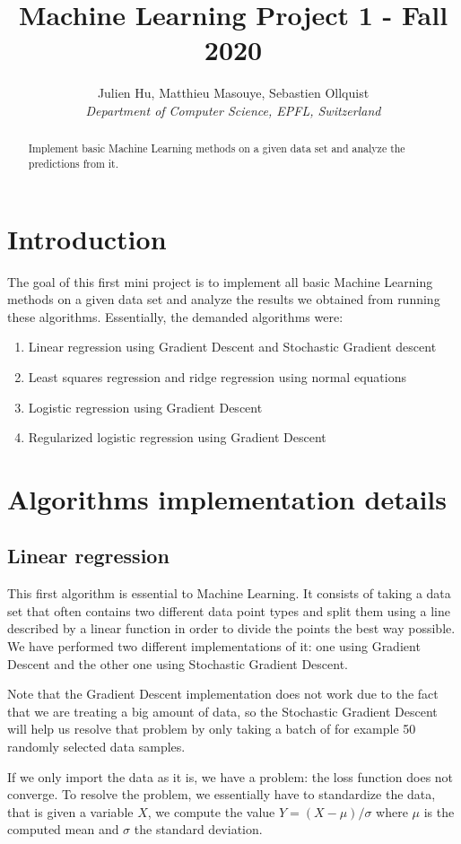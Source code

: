 \documentclass[10pt,conference,compsocconf]{IEEEtran}
\begin{document}
\title{Machine Learning Project 1 - Fall 2020}

\author{
  Julien Hu, Matthieu Masouye, Sebastien Ollquist\\
  \textit{Department of Computer Science, EPFL, Switzerland}
}

\maketitle

\begin{abstract}
  Implement basic Machine Learning methods on a given data set and analyze the predictions from it.
\end{abstract}

\section{Introduction}
The goal of this first mini project is to implement all basic Machine Learning methods on a given data set and analyze the results we obtained from running these algorithms. Essentially, the demanded algorithms were:
\begin{enumerate}
  \item Linear regression using Gradient Descent and Stochastic Gradient descent
  \item Least squares regression and ridge regression using normal equations
  \item Logistic regression using Gradient Descent
  \item Regularized logistic regression using Gradient Descent
\end{enumerate}

\section{Algorithms implementation details}
\subsection{Linear regression}
This first algorithm is essential to Machine Learning. It consists of taking a data set that often contains two different data point types and split them using a line described by a linear function in order to divide the points the best way possible. We have performed two different implementations of it: one using Gradient Descent and the other one using Stochastic Gradient Descent.\par
Note that the Gradient Descent implementation does not work due to the fact that we are treating a big amount of data, so the Stochastic Gradient Descent will help us resolve that problem by only taking a batch of for example 50 randomly selected data samples.\par
If we only import the data as it is, we have a problem: the loss function does not converge. To resolve the problem, we essentially have to standardize the data, that is given a variable $X$, we compute the value $Y=(X-\mu)/\sigma$ where $\mu$ is the computed mean and $\sigma$ the standard deviation.
\end{document}
